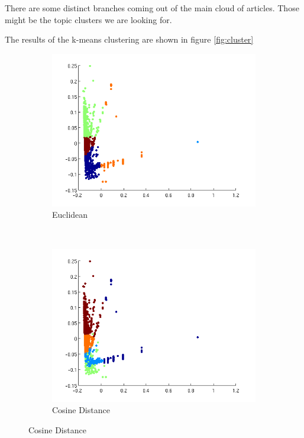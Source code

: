 \documentclass[a4paper,10pt]{article}
\begin{document}
There are some distinct branches coming out of the main cloud of articles. Those might be the topic clusters we are looking for.

The results of the k-means clustering are shown in figure \ref{fig:cluster}

\begin{figure}[h!]
\centering
\begin{subfigure}[b]{0.4\textwidth}
\includegraphics[width=\textwidth]{Images/classified1.png}
\caption{Euclidean}
\label{fig:euclidean}
\end{subfigure}
~
\begin{subfigure}[b]{0.4\textwidth}
\includegraphics[width=\textwidth]{Images/cosine.png}
\caption{Cosine Distance}

\end{subfigure}
\end{figure}
\end{document}
